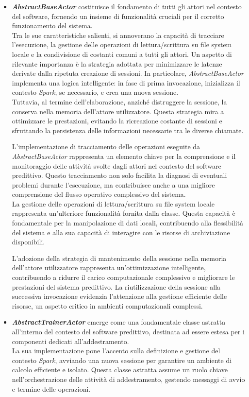 \begin{itemize}
    \item \textit{\textbf{AbstractBaseActor}} costituisce il fondamento di tutti gli attori nel contesto del software, fornendo un insieme di funzionalità cruciali per il corretto funzionamento del sistema. \\
    Tra le sue caratteristiche salienti, si annoverano la capacità di tracciare l'esecuzione, la gestione delle operazioni di lettura/scrittura su file system locale e la condivisione di costanti comuni a tutti gli attori.
    Un aspetto di rilevante importanza è la strategia adottata per minimizzare le latenze derivate dalla ripetuta creazione di sessioni.
    In particolare, \textit{AbstractBaseActor} implementa una logica intelligente: in fase di prima invocazione, inizializza il contesto \textit{Spark}, se necessario, e crea una nuova sessione. \\
    Tuttavia, al termine dell'elaborazione, anziché distruggere la sessione, la conserva nella memoria dell'attore utilizzatore.
    Questa strategia mira a ottimizzare le prestazioni, evitando la ricreazione costante di sessioni e sfruttando la persistenza delle informazioni necessarie tra le diverse chiamate.
    
    L'implementazione di tracciamento delle operazioni eseguite da \textit{AbstractBaseActor} rappresenta un elemento chiave per la comprensione e il monitoraggio delle attività svolte dagli attori nel contesto del software predittivo.
    Questo tracciamento non solo facilita la diagnosi di eventuali problemi durante l'esecuzione, ma contribuisce anche a una migliore comprensione del flusso operativo complessivo del sistema. \\
    La gestione delle operazioni di lettura/scrittura su file system locale rappresenta un'ulteriore funzionalità fornita dalla classe.
    Questa capacità è fondamentale per la manipolazione di dati locali, contribuendo alla flessibilità del sistema e alla sua capacità di interagire con le risorse di archiviazione disponibili. 

    L'adozione della strategia di mantenimento della sessione nella memoria dell'attore utilizzatore rappresenta un'ottimizzazione intelligente, contribuendo a ridurre il carico computazionale complessivo e migliorare le prestazioni del sistema predittivo.
    La riutilizzazione della sessione alla successiva invocazione evidenzia l'attenzione alla gestione efficiente delle risorse, un aspetto critico in ambienti computazionali complessi.
    \item \textit{\textbf{AbstractTrainerActor}} emerge come una fondamentale classe astratta all'interno del contesto del software predittivo, destinata ad essere estesa per i componenti dedicati all'addestramento. \\ 
    La sua implementazione pone l'accento sulla definizione e gestione del contesto \textit{Spark}, avviando una nuova sessione per garantire un ambiente di calcolo efficiente e isolato.
    Questa classe astratta assume un ruolo chiave nell'orchestrazione delle attività di addestramento, gestendo messaggi di avvio e termine delle operazioni. 


\end{itemize}
